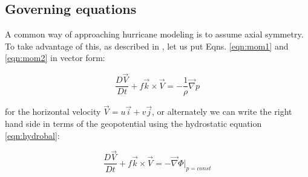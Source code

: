 \subsection{Governing equations}

A common way of approaching hurricane modeling is to assume axial symmetry. To take advantage of this, as described in \cite{holton_hakim_2019}, let us put Eqns. \ref{eqn:mom1} and \ref{eqn:mom2} in vector form:

\begin{equation}
    \frac{D\vec{V}}{Dt}+f\vec{k}\times\vec{V}=-\frac{1}{\rho}\vec{\nabla}p
\end{equation}

for the horizontal velocity $\vec{V}=u\vec{i}+v\vec{j}$, or alternately we can write the right hand side in terms of the geopotential using the hydrostatic equation \ref{eqn:hydrobal}:

\begin{equation}
    \frac{D\vec{V}}{Dt}+f\vec{k}\times\vec{V}=-\vec{\nabla}\Phi|_{p=const}
    \label{eqn:momvec}
\end{equation}



